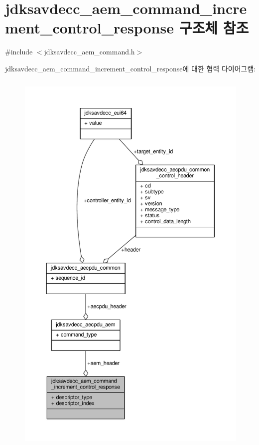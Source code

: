 \hypertarget{structjdksavdecc__aem__command__increment__control__response}{}\section{jdksavdecc\+\_\+aem\+\_\+command\+\_\+increment\+\_\+control\+\_\+response 구조체 참조}
\label{structjdksavdecc__aem__command__increment__control__response}


{\ttfamily \#include $<$jdksavdecc\+\_\+aem\+\_\+command.\+h$>$}



jdksavdecc\+\_\+aem\+\_\+command\+\_\+increment\+\_\+control\+\_\+response에 대한 협력 다이어그램\+:
\nopagebreak
\begin{figure}[H]
\begin{center}
\leavevmode
\includegraphics[height=550pt]{structjdksavdecc__aem__command__increment__control__response__coll__graph}
\end{center}
\end{figure}
